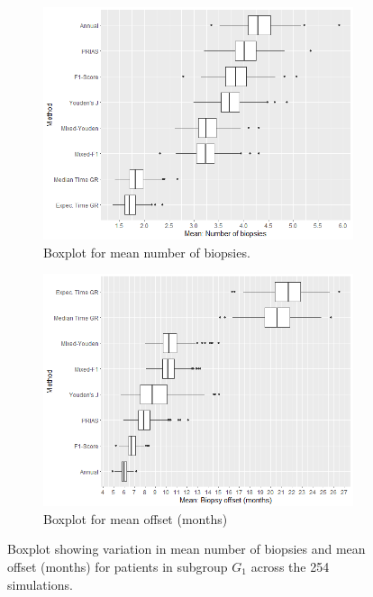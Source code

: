 \begin{figure}[!htb]
    \centering
    \captionsetup{justification=centering}
     \begin{subfigure}[b]{0.45\textwidth}
        \includegraphics[width=\textwidth]{images/sim_study/nbMeanBoxPlot_scale_4.png}
        \caption{Boxplot for mean number of biopsies.}
        \label{fig : nbMeanBoxPlot_G1}
    \end{subfigure}
    \begin{subfigure}[b]{0.45\textwidth}
        \includegraphics[width=\textwidth]{images/sim_study/offsetMeanBoxPlot_scale_4.png}
        \caption{Boxplot for mean offset (months)}
        \label{fig : offsetMeanBoxPlot_G1}
    \end{subfigure}      
    \caption{Boxplot showing variation in mean number of biopsies and mean offset (months) for patients in subgroup $G_1$ across the 254 simulations.}
    \label{fig : nbAndOffsetMeanBoxPlot_G1}
\end{figure}

